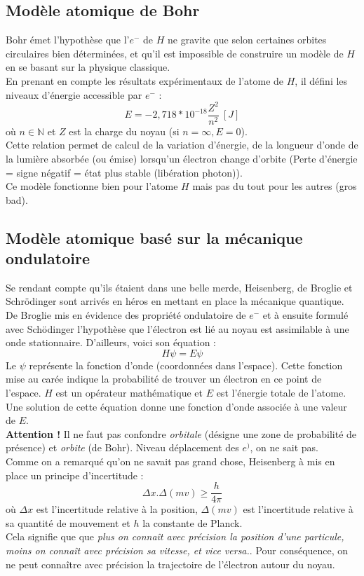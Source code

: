 \documentclass[12pt, a4paper]{article}
\begin{document}
\subsection{Modèle atomique de Bohr}
Bohr émet l'hypothèse que l'$e^-$ de $H$ ne gravite que selon certaines orbites circulaires bien déterminées, et qu'il est impossible de construire un modèle de $H$ en se basant sur la physique classique.\\
En prenant en compte les résultats expérimentaux de l'atome de $H$, il défini les niveaux d'énergie accessible par $e^-$ :
$$E = -2,718*10^{-18} \frac{Z^2}{n^2}\ [J]$$
où $n \in \mathbb{N}$ et $Z$ est la charge du noyau (si $n = \infty, E = 0$).\\
Cette relation permet de calcul de la variation d'énergie, de la longueur d'onde de la lumière absorbée (ou émise) lorsqu'un électron change d'orbite (Perte d'énergie = signe négatif = état plus stable (libération photon)).\\

Ce modèle fonctionne bien pour l'atome $H$ mais pas du tout pour les autres (gros bad).

\subsection{Modèle atomique basé sur la mécanique ondulatoire}
Se rendant compte qu'ils étaient dans une belle merde, Heisenberg, de Broglie et Schrödinger sont arrivés en héros en mettant en place la mécanique quantique.\\

De Broglie mis en évidence des propriété ondulatoire de $e^-$ et à ensuite formulé avec Schödinger l'hypothèse que l'électron est lié au noyau est assimilable à une onde stationnaire. D'ailleurs, voici son équation  :
$$H\psi = E\psi$$
Le $\psi$ représente la fonction d'onde (coordonnées dans l'espace). Cette fonction mise au carée indique la probabilité de trouver un électron en ce point de l'espace. $H$ est un opérateur mathématique et $E$ est l'énergie totale de l'atome.\\
Une solution de cette équation donne une fonction d'onde associée à une valeur de $E$.\\

\textbf{Attention ! } Il ne faut pas confondre \textit{orbitale} (désigne une zone de probabilité de présence) et \textit{orbite} (de Bohr). Niveau déplacement des $e^)$, on ne sait pas.\\

Comme on a remarqué qu'on ne savait pas grand chose, Heisenberg à mis en place un principe d'incertitude :
$$\Delta x . \Delta (mv) \geq \frac{h}{4\pi}$$
où $\Delta x$ est l'incertitude relative à la position, $\Delta (mv)$ est l'incertitude relative à sa quantité de mouvement et $h$ la constante de Planck.\\
Cela signifie que que \textit{plus on connaît avec précision la position d'une particule, moins on connaît avec précision sa vitesse, et vice versa.}. Pour conséquence, on ne peut connaître avec précision la trajectoire de l'électron autour du noyau.\\
\end{document}
